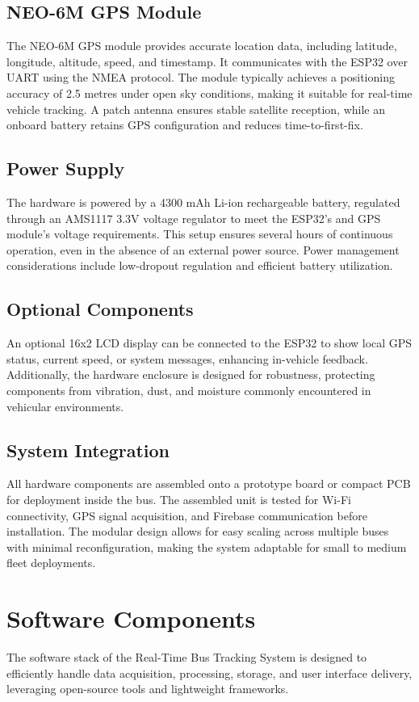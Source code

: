 \documentclass{article}
\begin{document}
\begin{multicols}{2}
\subsection{NEO-6M GPS Module}
The NEO-6M GPS module provides accurate location data, including latitude, longitude, altitude, speed, and timestamp. It communicates with the ESP32 over UART using the NMEA protocol. The module typically achieves a positioning accuracy of 2.5 metres under open sky conditions, making it suitable for real-time vehicle tracking. A patch antenna ensures stable satellite reception, while an onboard battery retains GPS configuration and reduces time-to-first-fix.

\subsection{Power Supply}
The hardware is powered by a 4300 mAh Li-ion rechargeable battery, regulated through an AMS1117 3.3V voltage regulator to meet the ESP32's and GPS module's voltage requirements. This setup ensures several hours of continuous operation, even in the absence of an external power source. Power management considerations include low-dropout regulation and efficient battery utilization.

\subsection{Optional Components}
An optional 16x2 LCD display can be connected to the ESP32 to show local GPS status, current speed, or system messages, enhancing in-vehicle feedback. Additionally, the hardware enclosure is designed for robustness, protecting components from vibration, dust, and moisture commonly encountered in vehicular environments.

\subsection{System Integration}
All hardware components are assembled onto a prototype board or compact PCB for deployment inside the bus. The assembled unit is tested for Wi-Fi connectivity, GPS signal acquisition, and Firebase communication before installation. The modular design allows for easy scaling across multiple buses with minimal reconfiguration, making the system adaptable for small to medium fleet deployments.

\section{Software Components}
\vspace{0.5em}
The software stack of the Real-Time Bus Tracking System is designed to efficiently handle data acquisition, processing, storage, and user interface delivery, leveraging open-source tools and lightweight frameworks.


\end{multicols}
\end{document}
